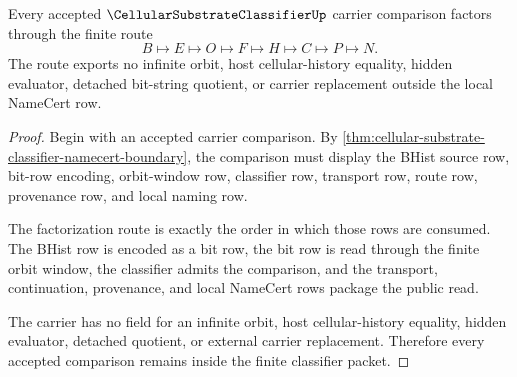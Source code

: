 \begin{theorem}
\label{thm:cellular-substrate-classifier-nonescape}
Every accepted $\CellularSubstrateClassifierUp$ carrier comparison factors through the finite route
$$
B \longmapsto E \longmapsto O \longmapsto F \longmapsto H \longmapsto C \longmapsto P \longmapsto N.
$$
The route exports no infinite orbit, host cellular-history equality, hidden evaluator, detached bit-string quotient, or carrier replacement outside the local NameCert row.
\end{theorem}
\begin{proof}
Begin with an accepted carrier comparison. By \autoref{thm:cellular-substrate-classifier-namecert-boundary}, the comparison must display the BHist source row, bit-row encoding, orbit-window row, classifier row, transport row, route row, provenance row, and local naming row.

The factorization route is exactly the order in which those rows are consumed. The BHist row is encoded as a bit row, the bit row is read through the finite orbit window, the classifier admits the comparison, and the transport, continuation, provenance, and local NameCert rows package the public read.

The carrier has no field for an infinite orbit, host cellular-history equality, hidden evaluator, detached quotient, or external carrier replacement. Therefore every accepted comparison remains inside the finite classifier packet.
\end{proof}

